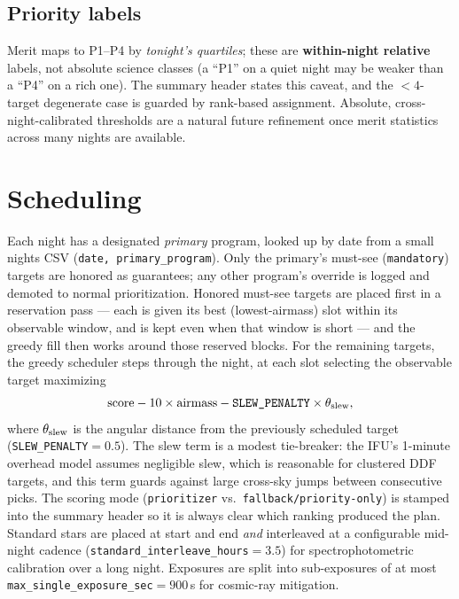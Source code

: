 \documentclass[11pt,letterpaper]{article}
\begin{document}
\subsection{Priority labels}
Merit maps to P1--P4 by \emph{tonight's quartiles}; these are \textbf{within-night relative}
labels, not absolute science classes (a ``P1'' on a quiet night may be weaker than a ``P4''
on a rich one). The summary header states this caveat, and the $<4$-target degenerate case
is guarded by rank-based assignment. Absolute, cross-night-calibrated thresholds are a
natural future refinement once merit statistics across many nights are available.

\section{Scheduling}\label{sec:sched}
Each night has a designated \emph{primary} program, looked up by date from a small nights
CSV (\texttt{date, primary\_program}). Only the primary's must-see (\texttt{mandatory})
targets are honored as guarantees; any other program's override is logged and demoted to
normal prioritization. Honored must-see targets are placed first in a reservation pass ---
each is given its best (lowest-airmass) slot within its observable window, and is kept even
when that window is short --- and the greedy fill then works around those reserved blocks.
For the remaining targets, the greedy scheduler steps through the night, at each slot
selecting the observable target maximizing
\begin{equation}
\text{score} - 10\times\text{airmass} - \texttt{SLEW\_PENALTY}\times\theta_{\rm slew},
\end{equation}
where $\theta_{\rm slew}$ is the angular distance from the previously scheduled target
(\texttt{SLEW\_PENALTY}$=0.5$). The slew term is a modest tie-breaker: the IFU's 1-minute
overhead model assumes negligible slew, which is reasonable for clustered DDF targets, and
this term guards against large cross-sky jumps between consecutive picks. The scoring mode
(\texttt{prioritizer} vs.\ \texttt{fallback/priority-only}) is stamped into the summary
header so it is always clear which ranking produced the plan. Standard stars are placed at
start and end \emph{and} interleaved at a configurable mid-night cadence
(\texttt{standard\_interleave\_hours}$=3.5$) for spectrophotometric calibration over a long
night. Exposures are split into sub-exposures of at most
\texttt{max\_single\_exposure\_sec}$=900$\,s for cosmic-ray mitigation.
\end{document}
